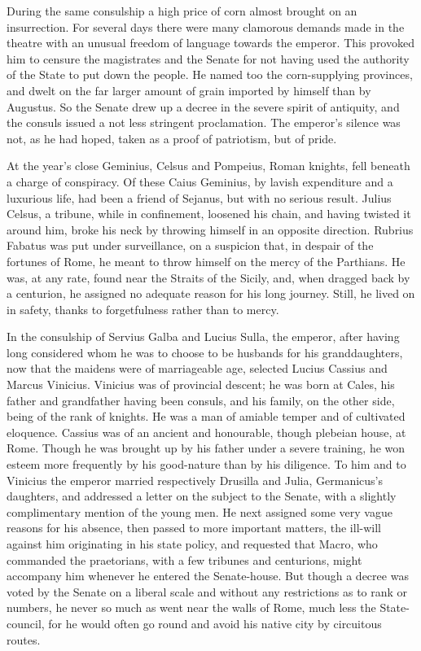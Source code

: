 
During the same consulship a high price of corn almost brought on an insurrection. For several days there were many clamorous demands made in the theatre with an unusual freedom of language towards the emperor. This provoked him to censure the magistrates and the Senate for not having used the authority of the State to put down the people. He named too the corn-supplying provinces, and dwelt on the far larger amount of grain imported by himself than by Augustus. So the Senate drew up a decree in the severe spirit of antiquity, and the consuls issued a not less stringent proclamation. The emperor's silence was not, as he had hoped, taken as a proof of patriotism, but of pride.


At the year's close Geminius, Celsus and Pompeius, Roman knights, fell beneath a charge of conspiracy. Of these Caius Geminius, by lavish expenditure and a luxurious life, had been a friend of Sejanus, but with no serious result. Julius Celsus, a tribune, while in confinement, loosened his chain, and having twisted it around him, broke his neck by throwing himself in an opposite direction. Rubrius Fabatus was put under surveillance, on a suspicion that, in despair of the fortunes of Rome, he meant to throw himself on the mercy of the Parthians. He was, at any rate, found near the Straits of the Sicily, and, when dragged back by a centurion, he assigned no adequate reason for his long journey. Still, he lived on in safety, thanks to forgetfulness rather than to mercy.


In the consulship of Servius Galba and Lucius Sulla, the emperor, after having long considered whom he was to choose to be husbands for his granddaughters, now that the maidens were of marriageable age, selected Lucius Cassius and Marcus Vinicius. Vinicius was of provincial descent; he was born at Cales, his father and grandfather having been consuls, and his family, on the other side, being of the rank of knights. He was a man of amiable temper and of cultivated eloquence. Cassius was of an ancient and honourable, though plebeian house, at Rome. Though he was brought up by his father under a severe training, he won esteem more frequently by his good-nature than by his diligence. To him and to Vinicius the emperor married respectively Drusilla and Julia, Germanicus's daughters, and addressed a letter on the subject to the Senate, with a slightly complimentary mention of the young men. He next assigned some very vague reasons for his absence, then passed to more important matters, the ill-will against him originating in his state policy, and requested that Macro, who commanded the praetorians, with a few tribunes and centurions, might accompany him whenever he entered the Senate-house. But though a decree was voted by the Senate on a liberal scale and without any restrictions as to rank or numbers, he never so much as went near the walls of Rome, much less the State-council, for he would often go round and avoid his native city by circuitous routes.

